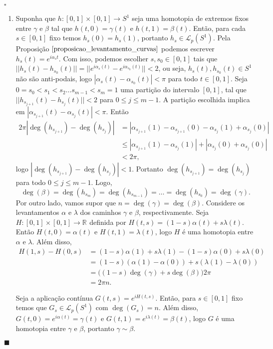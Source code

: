 \documentclass[12pt]{book}
\newenvironment{prova}[1]{$\square$ #1}{\hfill$\blacksquare$}
\newcommand{\caminhos}{\mathcal{L}}
\newcommand{\caminhospontobasegeral}[2]{\caminhos_{#1}(#2)}
\newcommand{\circulo}{S^{1}}
\newcommand{\norma}[1]{||#1||}
\newcommand{\real}[1]{\mathbb{R}^{#1}}
\begin{document}
\begin{prova}
\begin{enumerate}
			\item Suponha que $h:[0,1]\times [0,1]\to S^{1}$ seja uma homotopia de extremos fixos entre $\gamma$ e $\beta$ tal que $h(t,0) = \gamma(t)$ e $h(t,1) = \beta(t)$. Então, para cada $s \in [0,1]$ fixo temos $h_{s}(0) = h_{s}(1)$, portanto $h_{s} \in \caminhospontobasegeral{p}{\circulo}$. Pela Proposição $\ref{proposicao_levantamento_curvas}$ podemos escrever $h_{s}(t) = e^{i\alpha_{s}t}$. Com isso, podemos escolher $s, s_{0 }\in [0,1]$ tais que $\norma{h_{s}(t)-h_{s_{0}}(t)} =\norma{e^{i\alpha_{s}(t)} - e^{i\alpha_{s_{0}}(t)}} <2$, ou seja, $h_{s}(t), h_{s_{0}}(t) \in \circulo$ não são anti-podais, logo $|\alpha_{s}(t)-\alpha_{s_{0}}(t)| <\pi$ para todo $t\in [0,1]$. Seja $0=s_{0}<s_{1}<s_{2}\dots s_{m-1}<s_{m} = 1$ uma partição do intervalo $[0,1]$, tal que $\norma{h_{s_{j+1}}(t)-h_{s_{j}}(t)}<2$ para $0\leq j \leq m-1$. A partição escolhida implica em $|\alpha_{s_{j+1}}(t)-\alpha_{s_{j}}(t)| <\pi$. Então
			$$
			\begin{aligned}
			2\pi|\deg(h_{s_{j+1}})-\deg(h_{s_{j}})| 
			&= |\alpha_{s_{j+1}}(1)-\alpha_{s_{j+1}}(0) - \alpha_{s_{j}}(1)+\alpha_{s_{j}}(0)|
			\\
			&\leq |\alpha_{s_{j+1}}(1)-\alpha_{s_{j}}(1)| + |\alpha_{s_{j}}(0)+\alpha_{s_{j}}(0)|
			\\
			&<2\pi,
			\end{aligned} 
			$$
			logo $|\deg(h_{s_{j+1}})-\deg(h_{s_{j}})| <1$. Portanto $\deg(h_{s_{j+1}})=\deg(h_{s_{j}})$ para todo $0\leq j \leq m-1$. Logo, 
			$$
			\deg(\beta) = \deg(h_{s_{m}})=\deg(h_{s_{m-1}})=\dots=\deg(h_{s_{0}}) = \deg(\gamma).
			$$
			Por outro lado, vamos supor que $n = \deg(\gamma)=\deg(\beta)$. Considere os levantamentos $\alpha$ e $\lambda$ dos caminhos $\gamma$ e $\beta$, respectivamente. Seja $H:[0,1]\times [0,1] \to \real{}$ definida por $H(t,s) = (1-s)\alpha(t) + s\lambda(t)$. Então $H(t,0)=\alpha(t)$ e $H(t,1)=\lambda(t)$, logo $H$ é uma homotopia entre $\alpha$ e $\lambda$. Além disso, 
			$$
			\begin{aligned}
			H(1,s) - H(0,s) 
			&= (1-s)\alpha(1) + s\lambda(1) - (1-s)\alpha(0) + s\lambda(0) 
			\\
			&= (1-s)(\alpha(1)-\alpha(0)) + s(\lambda(1)-\lambda(0))
			\\
			&=\big( (1-s)\deg(\gamma) +s\deg(\beta)\big)2\pi
			\\
			&= 2\pi n.
			\end{aligned}
			$$ 
			
			Seja a aplicação contínua $G(t, s) = e^{iH(t,s)}$. Então, para $s \in [0,1]$ fixo temos que $G_{s} \in \caminhospontobasegeral{p}{\circulo}$ com $\deg(G_{s}) = n$. Além disso, $G(t,0) = e^{i\alpha(t)} = \gamma(t)$ e $G(t,1) = e^{i\lambda(t)} = \beta(t)$, logo $G$ é uma homotopia entre $\gamma$ e $\beta$, portanto $\gamma \sim \beta$.
			

\end{enumerate}
\end{prova}
\end{document}
